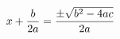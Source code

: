 \documentclass[preview]{standalone}
\begin{document}
\begin{align*}
x + { b \over 2 a } = { \pm \sqrt { b ^2 - 4 a c } \over 2 a }
\end{align*}
\end{document}
